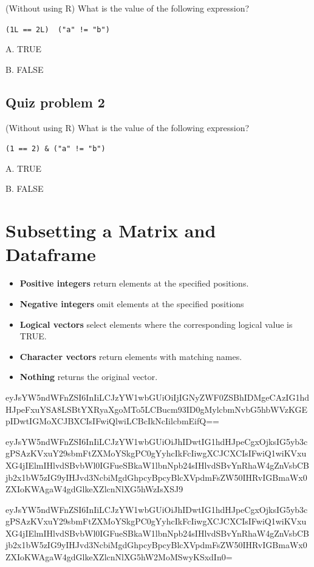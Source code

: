 \documentclass[]{book}
\providecommand{\tightlist}{%
  \setlength{\itemsep}{0pt}\setlength{\parskip}{0pt}}
\begin{document}
(Without using R) What is the value of the following expression?

\texttt{(1L\ ==\ 2L)\ \textbar{}\ ("a"\ !=\ "b")}

A. TRUE

B. FALSE

\hypertarget{quiz-problem-2-1}{%
\subsection{Quiz problem 2}\label{quiz-problem-2-1}}

(Without using R) What is the value of the following expression?

\texttt{(1\ ==\ 2)\ \&\ ("a"\ !=\ "b")}

A. TRUE

B. FALSE

\hypertarget{subsetting-a-matrix-and-dataframe}{%
\section{Subsetting a Matrix and Dataframe}\label{subsetting-a-matrix-and-dataframe}}

\begin{itemize}
\tightlist
\item
  \textbf{Positive integers} return elements at the specified positions.
\item
  \textbf{Negative integers} omit elements at the specified positions
\item
  \textbf{Logical vectors} select elements where the corresponding logical value is TRUE.
\item
  \textbf{Character vectors} return elements with matching names.
\item
  \textbf{Nothing} returns the original vector.
\end{itemize}

eyJsYW5ndWFnZSI6InIiLCJzYW1wbGUiOiIjIGNyZWF0ZSBhIDMgeCAzIG1hdHJpeFxuYSA8LSBtYXRyaXgoMTo5LCBucm93ID0gMylcbmNvbG5hbWVzKGEpIDwtIGMoXCJBXCIsIFwiQlwiLCBcIkNcIilcbmEifQ==

eyJsYW5ndWFnZSI6InIiLCJzYW1wbGUiOiJhIDwtIG1hdHJpeCgxOjksIG5yb3cgPSAzKVxuY29sbmFtZXMoYSkgPC0gYyhcIkFcIiwgXCJCXCIsIFwiQ1wiKVxuXG4jIElmIHlvdSBvbWl0IGFueSBkaW1lbnNpb24sIHlvdSBvYnRhaW4gZnVsbCBjb2x1bW5zIG9yIHJvd3NcbiMgdGhpcyBpcyBlcXVpdmFsZW50IHRvIGBmaWx0ZXIoKWAgaW4gdGlkeXZlcnNlXG5hWzIsXSJ9

eyJsYW5ndWFnZSI6InIiLCJzYW1wbGUiOiJhIDwtIG1hdHJpeCgxOjksIG5yb3cgPSAzKVxuY29sbmFtZXMoYSkgPC0gYyhcIkFcIiwgXCJCXCIsIFwiQ1wiKVxuXG4jIElmIHlvdSBvbWl0IGFueSBkaW1lbnNpb24sIHlvdSBvYnRhaW4gZnVsbCBjb2x1bW5zIG9yIHJvd3NcbiMgdGhpcyBpcyBlcXVpdmFsZW50IHRvIGBmaWx0ZXIoKWAgaW4gdGlkeXZlcnNlXG5hW2MoMSwyKSxdIn0=
\end{document}
